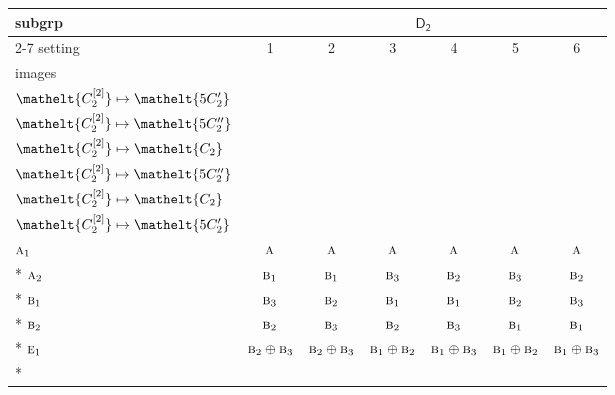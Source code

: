\documentclass[10pt,a4paper]{article}
\numberwithin{equation}{section}
\newcommand{\eltfont}[1]{{\let\sigma\eltsigma\mathelt{#1}}}
\newcommand{\grp}[1]{\mathsf{#1}}
\newcommand{\irr}[1]{\text{\normalfont\scshape #1}}
\newcommand{\cls}[1]{\eltfont{#1}}
\newcommand{\genidx}[2]{#1^{[\mathrm{#2}]}}
\begin{document}
{\small\begin{longtable}{@{}lcccccc@{}}\toprule
subgrp & \multicolumn{6}{c}{\href{D2.pdf}{$\grp{D_{2}}$}}\\\cmidrule(lr){2-7}
setting & 1 & 2 & 3 & 4 & 5 & 6\\
images & {\scriptsize\begin{tabular}[t]{@{}c@{}}$\cls{\genidx{C_{2}}{1}} \mapsto \cls{C_{2}}$\\$\cls{\genidx{C_{2}}{2}} \mapsto \cls{5C_{2}'}$\end{tabular}} & {\scriptsize\begin{tabular}[t]{@{}c@{}}$\cls{\genidx{C_{2}}{1}} \mapsto \cls{C_{2}}$\\$\cls{\genidx{C_{2}}{2}} \mapsto \cls{5C_{2}''}$\end{tabular}} & {\scriptsize\begin{tabular}[t]{@{}c@{}}$\cls{\genidx{C_{2}}{1}} \mapsto \cls{5C_{2}'}$\\$\cls{\genidx{C_{2}}{2}} \mapsto \cls{C_{2}}$\end{tabular}} & {\scriptsize\begin{tabular}[t]{@{}c@{}}$\cls{\genidx{C_{2}}{1}} \mapsto \cls{5C_{2}'}$\\$\cls{\genidx{C_{2}}{2}} \mapsto \cls{5C_{2}''}$\end{tabular}} & {\scriptsize\begin{tabular}[t]{@{}c@{}}$\cls{\genidx{C_{2}}{1}} \mapsto \cls{5C_{2}''}$\\$\cls{\genidx{C_{2}}{2}} \mapsto \cls{C_{2}}$\end{tabular}} & {\scriptsize\begin{tabular}[t]{@{}c@{}}$\cls{\genidx{C_{2}}{1}} \mapsto \cls{5C_{2}''}$\\$\cls{\genidx{C_{2}}{2}} \mapsto \cls{5C_{2}'}$\end{tabular}}\\\midrule\endhead
\bottomrule\endfoot\endlastfoot
$\irr{a}_{1}$ & $\irr{a}$ & $\irr{a}$ & $\irr{a}$ & $\irr{a}$ & $\irr{a}$ & $\irr{a}$\\*
$\irr{a}_{2}$ & $\irr{b}_{1}$ & $\irr{b}_{1}$ & $\irr{b}_{3}$ & $\irr{b}_{2}$ & $\irr{b}_{3}$ & $\irr{b}_{2}$\\*
$\irr{b}_{1}$ & $\irr{b}_{3}$ & $\irr{b}_{2}$ & $\irr{b}_{1}$ & $\irr{b}_{1}$ & $\irr{b}_{2}$ & $\irr{b}_{3}$\\*
$\irr{b}_{2}$ & $\irr{b}_{2}$ & $\irr{b}_{3}$ & $\irr{b}_{2}$ & $\irr{b}_{3}$ & $\irr{b}_{1}$ & $\irr{b}_{1}$\\*
$\irr{e}_{1}$ & $\irr{b}_{2}\oplus \irr{b}_{3}$ & $\irr{b}_{2}\oplus \irr{b}_{3}$ & $\irr{b}_{1}\oplus \irr{b}_{2}$ & $\irr{b}_{1}\oplus \irr{b}_{3}$ & $\irr{b}_{1}\oplus \irr{b}_{2}$ & $\irr{b}_{1}\oplus \irr{b}_{3}$\\*

\end{longtable}}
\end{document}
